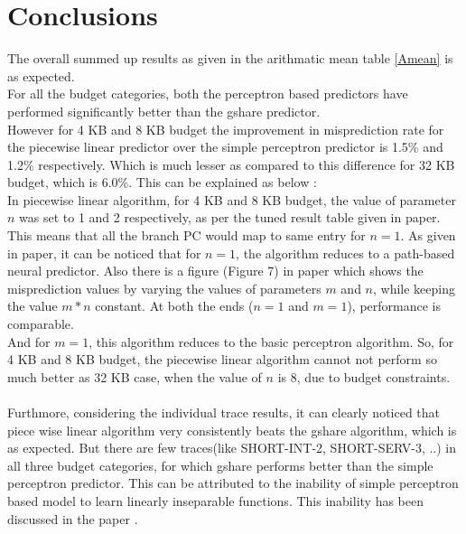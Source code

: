 \documentclass[paper=letter, fontsize=12pt]{article}
\begin{document}
\section{Conclusions}
The overall summed up results as given in the arithmatic mean table \ref{Amean} is as expected. \\
For all the budget categories, both the perceptron based predictors have performed significantly better than the gshare predictor. \\
However for 4 KB and 8 KB budget the improvement in misprediction rate for the piecewise linear predictor over the simple perceptron predictor is 1.5\% and 1.2\% respectively. Which is much lesser as compared to this difference for 32 KB budget, which is 6.0\%.
This can be explained as below : \\
In piecewise linear algorithm, for 4 KB and 8 KB budget, the value of parameter $ n $ was set to 1 and 2 respectively, as per the tuned result table given in paper. This means that all the branch PC would map to same entry for $n = 1$. As given in paper, it can be noticed that for $n = 1$, the algorithm reduces to a path-based neural predictor. Also there is a figure (Figure 7) in paper which shows the misprediction values by varying the values of parameters $m$ and $n$, while keeping the value $m*n$ constant. At both the ends ($n = 1$ and $m = 1$), performance is comparable. \\
And for $m = 1$, this algorithm reduces to the basic perceptron algorithm. So, for 4 KB and 8 KB budget, the piecewise linear algorithm cannot not perform so much better as 32 KB case, when the value of $n$ is 8, due to budget constraints.  \\ \\
Furthmore, considering the individual trace results, it can clearly noticed that piece wise linear algorithm very consistently beats the gshare algorithm, which is as expected. But there are few traces(like SHORT-INT-2, SHORT-SERV-3, ..) in all three budget categories, for which gshare performs better than the simple perceptron predictor. This can be attributed to the inability of simple perceptron based model to learn linearly inseparable functions. This inability has been discussed in the paper \cite{JimLin}.
\end{document}

